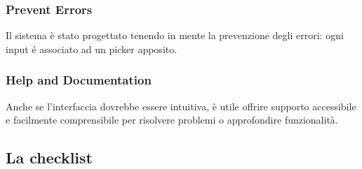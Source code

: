 \subsubsection{Prevent Errors}
Il sistema è stato progettato tenendo in mente la prevenzione degli errori: ogni
input é associato ad un picker apposito.

\subsubsection{Help and Documentation}
Anche se l'interfaccia dovrebbe essere intuitiva, è utile offrire supporto accessibile e facilmente comprensibile 
per risolvere problemi o approfondire funzionalità.

\subsection{La checklist}
